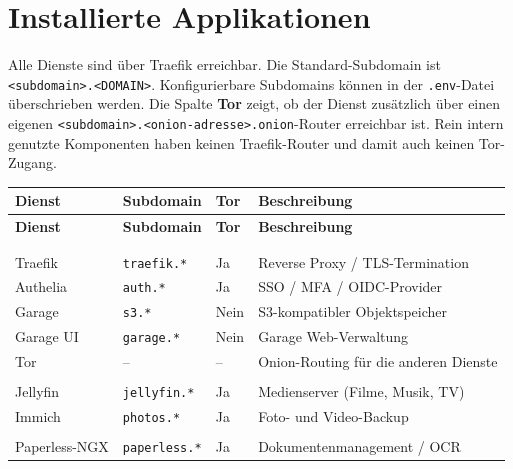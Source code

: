 \section{Installierte Applikationen}
\label{sec:apps}

Alle Dienste sind über Traefik erreichbar. Die Standard-Subdomain ist \texttt{<subdomain>.<DOMAIN>}. Konfigurierbare Subdomains können in der \texttt{.env}-Datei überschrieben werden. Die Spalte \textbf{Tor} zeigt, ob der Dienst zusätzlich über einen eigenen \texttt{<subdomain>.<onion-adresse>.onion}-Router erreichbar ist. Rein intern genutzte Komponenten haben keinen Traefik-Router und damit auch keinen Tor-Zugang.


\begin{xltabular}{\linewidth}{@{} >{\leavevmode}p{3.2cm} p{3.5cm} p{1.3cm} >{\RaggedRight\arraybackslash\leavevmode}X @{}}
  \toprule
  \textbf{Dienst} & \textbf{Subdomain} & \textbf{Tor} & \textbf{Beschreibung} \\
  \midrule
  \endfirsthead
  \toprule
  \textbf{Dienst} & \textbf{Subdomain} & \textbf{Tor} & \textbf{Beschreibung} \\
  \midrule
  \endhead
  \midrule
   \\
  \endfoot
  \bottomrule
  \endlastfoot
   \\
  Traefik         & \texttt{traefik.*}      & Ja   & Reverse Proxy / \acs{TLS}-Termination \\
  Authelia        & \texttt{auth.*}         & Ja   & \acs{SSO} / \acs{MFA} / \acs{OIDC}-Provider \\
  Garage          & \texttt{s3.*}           & Nein & \acs{S3}-kompatibler Objektspeicher \\
  Garage UI       & \texttt{garage.*}       & Nein & Garage Web-Verwaltung \\
  Tor             & --                      & --   & Onion-Routing für die anderen Dienste \\
  \midrule
   \\
  Jellyfin        & \texttt{jellyfin.*}     & Ja & Medienserver (Filme, Musik, TV) \\
  Immich          & \texttt{photos.*}       & Ja & Foto- und Video-Backup \\
  \midrule
   \\
  Paperless-NGX   & \texttt{paperless.*}    & Ja & Dokumentenmanagement / \acs{OCR} \\

\end{xltabular}

